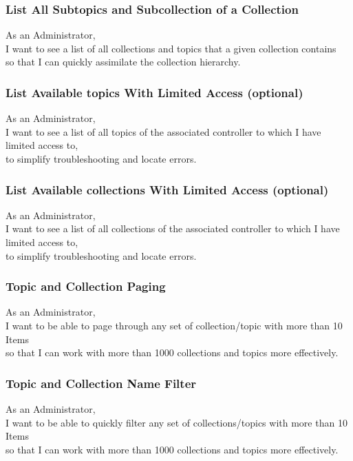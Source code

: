 \subsubsection{List All Subtopics and Subcollection of a Collection}
As an Administrator,\\
I want to see a list of all collections and topics that a given collection contains\\
so that I can quickly assimilate the collection hierarchy.

\subsubsection{List Available topics With Limited Access (optional)}

As an Administrator,\\
I want to see a list of all topics of the associated controller to which I have limited access to,\\
to simplify troubleshooting and locate errors.

\subsubsection{List Available collections With Limited Access (optional)}

As an Administrator,\\
I want to see a list of all collections of the associated controller to which I have limited access to,\\
to simplify troubleshooting and locate errors.

\subsubsection{Topic and Collection Paging}
As an Administrator,\\
I want to be able to page through any set of collection/topic with more than 10 Items \\
so that I can work with more than 1000 collections and topics more effectively.

\subsubsection{Topic and Collection Name Filter}\label{sec:requirement-topic-filter}
As an Administrator,\\
I want to be able to quickly filter any set of collections/topics with more than 10 Items \\
so that I can work with more than 1000 collections and topics more effectively.

